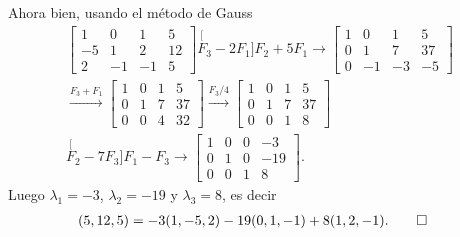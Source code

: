 \documentclass[handout]{beamer} %
\begin{document}
\begin{frame}
    Ahora bien, usando el método de Gauss
    \begin{multline*}
\left[\begin{array}{rrr|r}1 & 0 & 1 &  5 \\ -5 & 1 & 2 &  12 \\	2 & -1 & -1 &  5  \end{array}\right]
\stackrel[F_3 -2F_1]{F_2 + 5F_1}{\longrightarrow} 
\left[\begin{array}{rrr|r}1 & 0 & 1 &  5 \\ 0 & 1 & 7 &  37 \\	0 & -1 & -3 &  -5  \end{array}\right]
\\ \stackrel{F_3+F_1}{\longrightarrow}
\left[\begin{array}{rrr|r}1 & 0 & 1 &  5 \\ 0 & 1 & 7 &  37 \\	0 & 0 & 4 & 32  \end{array}\right]
\stackrel{F_3/4}{\longrightarrow} 
\left[\begin{array}{rrr|r}1 & 0 & 1 & 5 \\ 0 & 1 & 7 & 37 \\	0 & 0 & 1& 8  \end{array}\right]
\\ \stackrel[F_2 -7F_3]{F_1 - F_3}{\longrightarrow}
\left[\begin{array}{rrr|r}1 & 0 & 0 & -3 \\ 0 & 1 & 0 &  -19 \\	0 & 0 & 1& 8  \end{array}\right].
\end{multline*}	  \pause
Luego $\lambda_1= -3$, $\lambda_2 = -19$ y $\lambda_3=8$,  es decir
\begin{align*}
(5,12,5) &= -3(1,-5,2)-19 (0,1,-1)+8 (1,2,-1).\qed
\end{align*}
\end{frame}
                    
\end{document}
